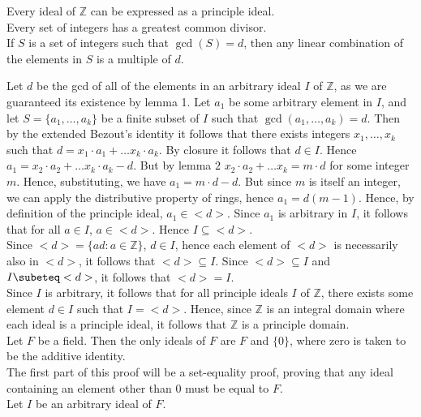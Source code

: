 \documentclass{article}
\theoremstyle{definition}
\newcommand{\Z}{\mathbb{Z}}
\begin{document}
 Every ideal of $\Z$ can be expressed as a principle ideal.\\

 Every set of integers has a greatest common divisor.\\

 If $S$ is a set of integers such that $\gcd(S) = d$, then any linear combination of the elements in $S$ is a multiple of $d$.

 Let $d$ be the gcd of all of the elements in an arbitrary ideal $I$ of $\Z$, as we are guaranteed its existence by lemma 1. Let $a_1$ be some arbitrary element in $I$, and let $S = \{a_1,\dots,a_k\}$ be a finite subset of $I$ such that $\gcd(a_1,\dots,a_k)= d$. Then by the extended Bezout's identity it follows that there exists integers $x_1,\dots,x_k$ such that $d = x_1\cdot a_1+ \dots x_k\cdot a_k$. By closure it follows that $d\in I$. Hence $a_1 = x_2\cdot a_2 + \dots x_k \cdot a_k - d$. But by lemma $2$ $x_2\cdot a_2 + \dots x_k = m\cdot d$ for some integer $m$. Hence, substituting, we have $a_1 = m\cdot d - d$. But since $m$ is itself an integer, we can apply the distributive property of rings, hence $a_1 = d(m-1)$. Hence, by definition of the principle ideal, $a_1 \in <d>$. Since $a_1$ is arbitrary in $I$, it follows that for all $a\in I$, $a\in <d>$. Hence $I\subseteq <d>$.\\

Since $<d> = \{ad: a\in \Z\}$, $d\in I$, hence each element of $<d>$ is necessarily also in $<d>$, it follows that $<d>\subseteq I$. Since $<d>\subseteq I$ and $I\subeteq <d>$, it follows that $<d> = I$.
\\

Since $I$ is arbitrary, it follows that for all principle ideals $I$ of $\Z$, there exists some element $d\in I$ such that $I = <d>$. Hence, since $\Z$ is an integral domain where each ideal is a principle ideal, it follows that $\Z$ is a principle domain.\\

 Let $F$ be a field. Then the only ideals of $F$ are $F$ and $\{0\}$, where zero is taken to be the additive identity.\\
 The first part of this proof will be a set-equality proof, proving that any ideal containing an element other than $0$ must be equal to $F$.\\
Let $I$ be an arbitrary ideal of $F$. 
\end{document}

